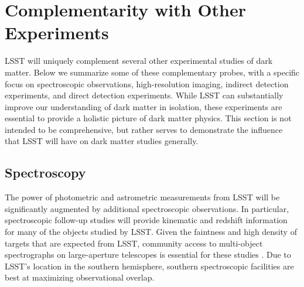 \chapter{Complementarity with Other Experiments}
\label{sec:complementarity}
\bigskip



LSST will uniquely complement several other experimental studies of dark matter.
Below we summarize some of these complementary probes, with a specific focus on spectroscopic observations, high-resolution imaging, indirect detection experiments, and direct detection experiments.
While LSST can substantially improve our understanding of dark matter in isolation, these experiments are essential to provide a holistic picture of dark matter physics.
This section is not intended to be comprehensive, but rather serves to demonstrate the influence that LSST will have on dark matter studies generally.

\section{Spectroscopy }
\label{sec:spectroscopy}

The power of photometric and astrometric measurements from LSST will be significantly augmented by additional spectroscopic observations.
In particular, spectroscopic follow-up studies will provide kinematic and redshift information for many of the objects studied by LSST.
Given the faintness and high density of targets that are expected from LSST, community access to multi-object spectrographs on large-aperture telescopes is essential for these studies \citep{2016arXiv161001661N}. 
Due to LSST's location in the southern hemisphere, southern spectroscopic facilities are best at maximizing observational overlap.

